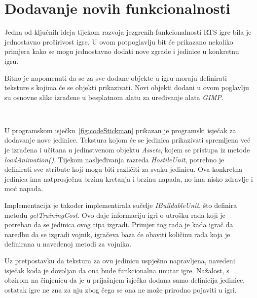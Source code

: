 \documentclass[times, utf8, zavrsni, numeric]{fer}
\begin{document}
\section{Dodavanje novih funkcionalnosti}

\par Jedna od ključnih ideja tijekom razvoja jezgrenih funkcionalnosti RTS igre bila je jednostavno proširivost igre.
U ovom potpoglavlju bit će prikazano nekoliko primjera kako se mogu jednostavno dodati nove zgrade i jedinice u konkretnu igru.

\par Bitno je napomenuti da se za sve dodane objekte u igru moraju definirati teksture s kojima će se objekti prikazivati.
Novi objekti dodani u ovom poglavlju su osnovne slike izrađene u besplatnom alatu za uređivanje alata \textit{GIMP}.

\begin{minipage}{\textwidth}
	
\end{minipage}\

\par U programskom isječku~\ref{fig:codeStickman} prikazan je programski isječak za dodavanje nove jedinice.
Tekstura kojom će se jedinica prikazivati spremljena već je izrađena i učitana u jedinstvenom objektu \textit{Assets}, kojem se pristupa iz metode \textit{loadAnimation()}.
Tijekom nasljeđivanja razreda \textit{HostileUnit}, potrebno je definirati sve atribute koji mogu biti različiti za svaku jedinicu.
Ova konkretna jedinica ima natprosječnu brzinu kretanja i brzinu napada, no ima nisko zdravlje i moć napada.

\par Implementacija je također implementirala sučelje \textit{IBuildableUnit}, što definira metodu \textit{getTrainingCost}.
Ovo daje informaciju igri o utrošku rada koji je potreban da se jedinica ovog tipa izgradi.
Primjer tog rada je kada igrač da naredbu da se izgradi vojnik, igračeva baza će obaviti količinu rada koja je definirana u navedenoj metodi za vojnika.

\par Uz pretpostavku da tekstura za ovu jedinicu uspješno napravljena, navedeni isječak koda je dovoljan da ona bude funkcionalna unutar igre.
Nažalost, s obzirom na činjenicu da je u prijašnjem isječka dodana samo definicija jedinice, ostatak igre ne zna za nju zbog čega se ona ne može prirodno pojaviti u igri.
\end{document}
